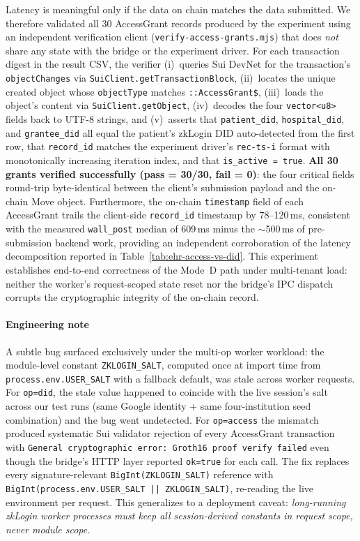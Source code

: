 Latency is meaningful only if the data on chain matches the data
submitted. We therefore validated all 30 AccessGrant records produced
by the experiment using an independent verification client
(\texttt{verify-access-grants.mjs}) that does \emph{not} share any
state with the bridge or the experiment driver. For each transaction
digest in the result CSV, the verifier (i)~queries Sui DevNet for the
transaction's \texttt{objectChanges} via
\texttt{SuiClient.getTransactionBlock}, (ii)~locates the unique
created object whose \texttt{objectType} matches
\texttt{::AccessGrant\$}, (iii)~loads the object's content via
\texttt{SuiClient.getObject}, (iv)~decodes the four
\texttt{vector<u8>} fields back to UTF-8 strings, and (v)~asserts
that \texttt{patient\_did}, \texttt{hospital\_did}, and
\texttt{grantee\_did} all equal the patient's zkLogin DID
auto-detected from the first row, that
\texttt{record\_id} matches the experiment driver's
\texttt{rec-\textlangle ts\textrangle-\textlangle i\textrangle} format
with monotonically increasing iteration index, and that
\texttt{is\_active = true}. \textbf{All 30 grants verified
successfully (pass = 30/30, fail = 0)}: the four critical fields
round-trip byte-identical between the client's submission payload and
the on-chain Move object. Furthermore, the on-chain
\texttt{timestamp} field of each AccessGrant trails the client-side
\texttt{record\_id} timestamp by 78--120\,ms, consistent with the
measured \texttt{wall\_post} median of 609\,ms minus the
$\sim$500\,ms of pre-submission backend work, providing an
independent corroboration of the latency decomposition reported in
Table~\ref{tab:ehr-access-vs-did}. This experiment establishes
end-to-end correctness of the Mode~D path under multi-tenant load:
neither the worker's request-scoped state reset nor the bridge's
IPC dispatch corrupts the cryptographic integrity of the on-chain
record.

\paragraph{Engineering note}

A subtle bug surfaced exclusively under the multi-op worker workload:
the module-level constant \texttt{ZKLOGIN\_SALT}, computed once at
import time from \texttt{process.env.USER\_SALT} with a fallback
default, was stale across worker requests. For \texttt{op=did}, the
stale value happened to coincide with the live session's salt across
our test runs (same Google identity + same four-institution seed
combination) and the bug went undetected. For \texttt{op=access} the
mismatch produced systematic Sui validator rejection of every
AccessGrant transaction with
\texttt{General cryptographic error: Groth16 proof verify failed}
even though the bridge's HTTP layer reported \texttt{ok=true} for each
call. The fix replaces every signature-relevant
\texttt{BigInt(ZKLOGIN\_SALT)} reference with
\texttt{BigInt(process.env.USER\_SALT \string|\string| ZKLOGIN\_SALT)},
re-reading the live environment per request. This generalizes to a
deployment caveat: \emph{long-running zkLogin worker processes must
keep all session-derived constants in request scope, never module
scope.}
